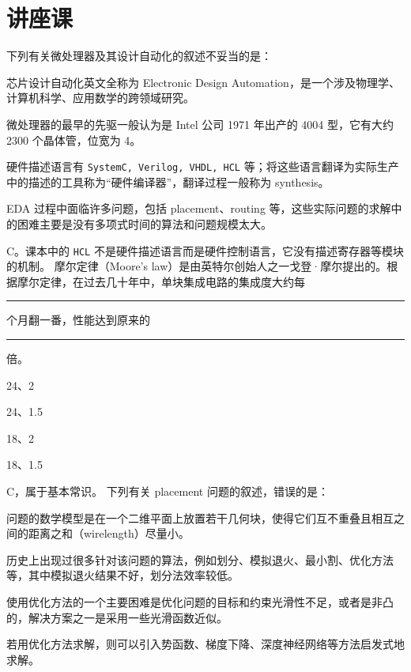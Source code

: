 \chapter{讲座课}\thispagestyle{empty}
    \begin{problems}
        \pro 下列有关微处理器及其设计自动化的叙述不妥当的是：
        \begin{choices}
            \item 芯片设计自动化英文全称为 Electronic Design Automation，是一个涉及物理学、计算机科学、应用数学的跨领域研究。
            \item 微处理器的最早的先驱一般认为是 Intel 公司 1971 年出产的 4004 型，它有大约 2300 个晶体管，位宽为 4。
            \item 硬件描述语言有 \verb|SystemC, Verilog, VHDL, HCL| 等；将这些语言翻译为实际生产中的描述的工具称为“硬件编译器”，翻译过程一般称为 synthesis。
            \item EDA 过程中面临许多问题，包括 placement、routing 等，这些实际问题的求解中的困难主要是没有多项式时间的算法和问题规模太大。
        \end{choices}
        \sol C。课本中的 \verb|HCL| 不是硬件描述语言而是硬件控制语言，它没有描述寄存器等模块的机制。
        \pro 摩尔定律（Moore's law）是由英特尔创始人之一戈登·摩尔提出的。根据摩尔定律，在过去几十年中，单块集成电路的集成度大约每 \rule{1cm}{0.25mm} 个月翻一番，性能达到原来的 \rule{1cm}{0.25mm} 倍。
        \begin{choices}
            \item 24、2
            \item 24、1.5
            \item 18、2
            \item 18、1.5
        \end{choices}
        \sol C，属于基本常识。
        \pro 下列有关 placement 问题的叙述，错误的是：
        \begin{choices}
            \item 问题的数学模型是在一个二维平面上放置若干几何块，使得它们互不重叠且相互之间的距离之和（wirelength）尽量小。
            \item 历史上出现过很多针对该问题的算法，例如划分、模拟退火、最小割、优化方法等，其中模拟退火结果不好，划分法效率较低。
            \item 使用优化方法的一个主要困难是优化问题的目标和约束光滑性不足，或者是非凸的，解决方案之一是采用一些光滑函数近似。
            \item 若用优化方法求解，则可以引入势函数、梯度下降、深度神经网络等方法启发式地求解。

\end{choices}
\end{problems}
